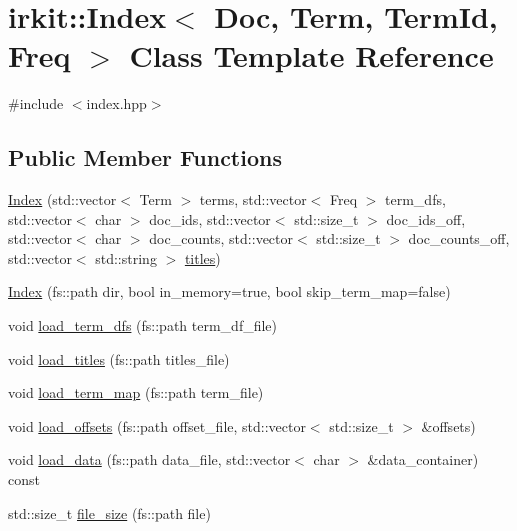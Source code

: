 \hypertarget{classirkit_1_1Index}{}\section{irkit\+:\+:Index$<$ Doc, Term, Term\+Id, Freq $>$ Class Template Reference}
\label{classirkit_1_1Index}


{\ttfamily \#include $<$index.\+hpp$>$}

\subsection*{Public Member Functions}
\begin{DoxyCompactItemize}
\item 
\hyperlink{classirkit_1_1Index_a42309f5d0a921f9663fa3980a3122839}{Index} (std\+::vector$<$ Term $>$ terms, std\+::vector$<$ Freq $>$ term\+\_\+dfs, std\+::vector$<$ char $>$ doc\+\_\+ids, std\+::vector$<$ std\+::size\+\_\+t $>$ doc\+\_\+ids\+\_\+off, std\+::vector$<$ char $>$ doc\+\_\+counts, std\+::vector$<$ std\+::size\+\_\+t $>$ doc\+\_\+counts\+\_\+off, std\+::vector$<$ std\+::string $>$ \hyperlink{classirkit_1_1Index_a632caff9525484c5d453d016c5cb586e}{titles})
\item 
\hyperlink{classirkit_1_1Index_ac5cba6928ec1e67be4f59089b3a51b89}{Index} (fs\+::path dir, bool in\+\_\+memory=true, bool skip\+\_\+term\+\_\+map=false)
\item 
void \hyperlink{classirkit_1_1Index_af8a4dd64292b2b7f7359ef1e62d75147}{load\+\_\+term\+\_\+dfs} (fs\+::path term\+\_\+df\+\_\+file)
\item 
void \hyperlink{classirkit_1_1Index_acd33c3a279e165a71594843d70e281f1}{load\+\_\+titles} (fs\+::path titles\+\_\+file)
\item 
void \hyperlink{classirkit_1_1Index_a2071c83ea3a4f128ea624fea8a24c9c9}{load\+\_\+term\+\_\+map} (fs\+::path term\+\_\+file)
\item 
void \hyperlink{classirkit_1_1Index_a1d44636a2174a740a9e648d2587254a6}{load\+\_\+offsets} (fs\+::path offset\+\_\+file, std\+::vector$<$ std\+::size\+\_\+t $>$ \&offsets)
\item 
void \hyperlink{classirkit_1_1Index_acdc1ba811044619795c2ab7eeed13abc}{load\+\_\+data} (fs\+::path data\+\_\+file, std\+::vector$<$ char $>$ \&data\+\_\+container) const
\item 
std\+::size\+\_\+t \hyperlink{classirkit_1_1Index_a47d88bb03c2c547fc159739b13871f68}{file\+\_\+size} (fs\+::path file)

\end{DoxyCompactItemize}
